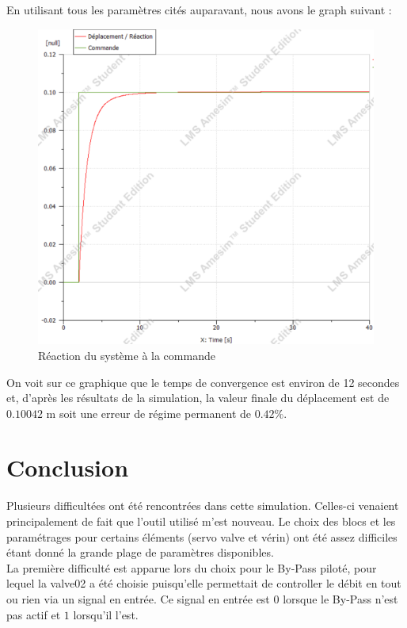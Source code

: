 \documentclass[a4paper,12pt,calibri,oneside,openany]{book}
\theoremstyle{break}
\begin{document}
En utilisant tous les paramètres cités auparavant, nous avons le graph suivant :
\begin{figure}[H]
	\centering\includegraphics[width=\linewidth]{graph}
	\caption{Réaction du système à la commande}
\end{figure}

On voit sur ce graphique que le temps de convergence est environ de 12 secondes et, d'après les résultats de la simulation, la valeur finale du déplacement est de $0.10042$ m soit une erreur de régime permanent de $0.42\%$.
\section{Conclusion}
Plusieurs difficultées ont été rencontrées dans cette simulation. Celles-ci venaient principalement de fait que l'outil utilisé m'est nouveau. Le choix des blocs et les paramétrages pour certains éléments (servo valve et vérin) ont été assez difficiles étant donné la grande plage de paramètres disponibles.\\

La première difficulté est apparue lors du choix pour le By-Pass piloté, pour lequel la valve02 a été choisie puisqu'elle permettait de controller le débit en tout ou rien via un signal en entrée. Ce signal en entrée est $0$ lorsque le By-Pass n'est pas actif et $1$ lorsqu'il l'est.\\
\end{document}
